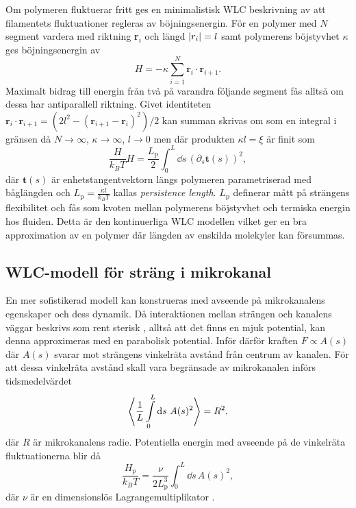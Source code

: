 Om polymeren fluktuerar fritt %
ges en minimalistisk WLC beskrivning av att filamentets fluktuationer regleras av böjningsenergin. För en polymer med $N$ segment vardera med riktning \textbf{r}$_i$ och längd $\abs{r_{i}}=l$ samt polymerens böjstyvhet $\kappa$ ges böjningsenergin av
\begin{equation}
    H = -\kappa\sum_{i=1}^{N}\textbf{r}_{i}\cdot \textbf{r}_{i+1}.
\end{equation}
Maximalt bidrag till energin från två på varandra följande segment fås alltså om dessa har antiparallell riktning. Givet identiteten $\textbf{r}_{i}\cdot\textbf{r}_{i+1}=(2l^2-(\textbf{r}_{i+1}-\textbf{r}_{i})^2)/2$ kan summan skrivas om som en integral i gränsen då $N \to \infty$, $\kappa\to\infty$, $l \to 0$ men där produkten $\kappa l=\xi$ är finit som 
\begin{equation}\label{böj}
    \frac{H}{k_{B}T}H=\frac{L_\text{p}}{2}\int_{0}^{L}\!\dd{s}\,(\partial_{s}\textbf{t}(s))^2,
\end{equation}
där $\textbf{t}(s)$ är enhetstangentvektorn längs polymeren parametriserad med båglängden och $L_\text{p}=\frac{\kappa l}{k_{B}T}$ kallas  \emph{persistence length}. $L_\text{p}$ definerar mått på strängens flexibilitet och fås som kvoten mellan polymerens böjstyvhet och termiska energin hos fluiden. Detta är den kontinuerliga WLC modellen \cite{Fixman_WLC1973} vilket ger en bra approximation av en polymer där längden av enskilda molekyler kan försummas. 


\subsection{WLC-modell för sträng i mikrokanal}
\label{WLCkanal}


En mer sofistikerad modell kan konstrueras med avseende på mikrokanalens egenskaper och dess dynamik. Då interaktionen mellan strängen och kanalens väggar beskrivs som rent sterisk \cite{Koster_etal2007}, alltså att det finns en mjuk potential, kan denna approximeras med en parabolisk potential. Inför därför kraften $F \propto A(s)$ där $A(s)$ svarar mot strängens vinkelräta avstånd från centrum av kanalen. För att dessa vinkelräta avstånd skall vara begränsade av mikrokanalen införs tidsmedelvärdet
\begin{equation}\label{jäm1}
\ev{\frac{1}{L}\int_{0}^{L}\dd{s} \, A(s)^{2}}=R^2,
\end{equation}
där $R$ är mikrokanalens radie. Potentiella energin med avseende på de vinkelräta fluktuationerna blir då \cite{Harnau&Reineker1999}
\begin{equation}
    \frac{H_{p}}{k_{B}T}=\frac{\nu}{2L_\text{p}^3}\int_{0}^{L} \!\dd{s} \, A(s)^2,
\end{equation}
där $\nu$ är en dimensionslös Lagrangemultiplikator \cite{Harnau&Reineker1999}.

